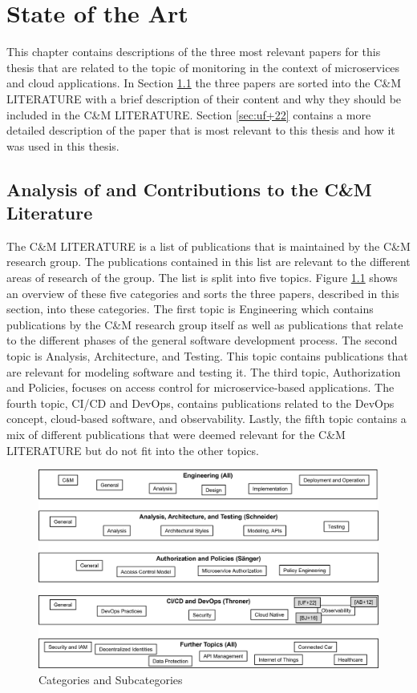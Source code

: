 \chapter{State of the Art}
\label{cha:state_of_the_art}

This chapter contains descriptions of the three most relevant papers for this thesis that are related to the topic
of monitoring in the context of microservices and cloud applications. In Section \ref{sec:cm_literature}
the three papers are sorted into the C\&M LITERATURE with a brief description of their content
and why they should be included in the C\&M LITERATURE. Section \ref{sec:uf+22}
contains a more detailed description of the paper that is most relevant to this thesis
and how it was used in this thesis.

\section{Analysis of and Contributions to the C\&M Literature}
\label{sec:cm_literature}

The C\&M LITERATURE is a list of publications that is maintained by the C\&M research group.
The publications contained in this list are relevant to the different areas of research of the group.
The list is split into five topics. Figure \ref{fig:categories_subcategories} shows an overview of these five categories and
sorts the three papers, described in this section, into these categories. The first topic is Engineering which contains publications
by the C\&M research group itself as well as publications that relate to the different phases
of the general software development process. The second topic is Analysis, Architecture, and Testing.
This topic contains publications that are relevant for modeling software and testing it.
The third topic, Authorization and Policies, focuses on access control for microservice-based applications.
The fourth topic, CI/CD and DevOps, contains publications related to the DevOps concept,
cloud-based software, and observability. Lastly, the fifth topic contains a mix of different publications
that were deemed relevant for the C\&M LITERATURE but do not fit into the other topics.

\begin{figure}[tb]
    \centering
    \includegraphics[width=\linewidth]{figures/literature.png}
    \caption{Categories and Subcategories}
    \label{fig:categories_subcategories}
\end{figure}

